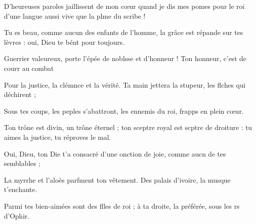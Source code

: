 \item D’heureuses paroles jaillissent de mon cœur\pscross{} quand je dis mes pomes pour le roi\psstar{} d’une langue aussi vive que la plme du scribe !
\item Tu es beau, comme aucun des enfants de l’homme,\pscross{} la grâce est répande sur tes lèvres :\psstar{} oui, Dieu te bént pour toujours.
\item Guerrier valeureux, porte l’épée de noblsse et d’honneur !\psstar{} Ton honneur, c’est de courr au combat 
\item Pour la justice, la clémnce et la vérité.\psstar{} Ta main jettera la stupeur, les flches qui déchirent ; 
\item Sous tes coups, les peples s’abattront,\psstar{} les ennemis du roi, frapps en plein cœur.
\item Ton trône est divin, un trône éternel ;\pscross{} ton sceptre royal est scptre de droiture :\psstar{} tu aimes la justice, tu réproves le mal. 
\item Oui, Dieu, ton Die t’a consacré\psstar{} d’une onction de joie, comme aucn de tes semblables ;
\item La myrrhe et l’aloès parfment ton vêtement.\psstar{} Des palais d’ivoire, la musque t’enchante.
\item Parmi tes bien-aimées sont des flles de roi ;\psstar{} à ta droite, la préférée, sous les rs d’Ophir.